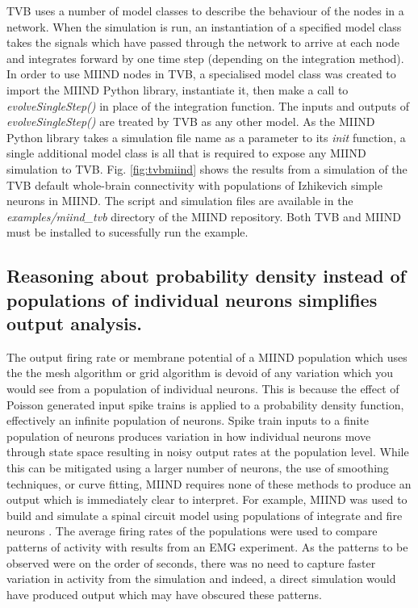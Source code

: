 \documentclass[utf8]{frontiersSCNS} %
\begin{document}
TVB uses a number of model classes to describe the behaviour of the nodes in a network. When the simulation is run, an instantiation of a specified model class takes the signals which have passed through the network to arrive at each node and integrates forward by one time step (depending on the integration method). In order to use MIIND nodes in TVB, a specialised model class was created to import the MIIND Python library, instantiate it, then make a call to \textit{evolveSingleStep()} in place of the integration function. The inputs and outputs of \textit{evolveSingleStep()} are treated by TVB as any other model. As the MIIND Python library takes a simulation file name as a parameter to its \textit{init} function, a single additional model class is all that is required to expose any MIIND simulation to TVB. Fig. \ref{fig:tvbmiind} shows the results from a simulation of the TVB default whole-brain connectivity with populations of Izhikevich simple neurons in MIIND. The script and simulation files are available in the \textit{examples/miind\_tvb} directory of the MIIND repository. Both TVB and MIIND must be installed to sucessfully run the example. \\

\subsection*{Reasoning about probability density instead of populations of individual neurons simplifies output analysis.}
The output firing rate or membrane potential of a MIIND population which uses the the mesh algorithm or grid algorithm is devoid of any variation which you would see from a population of individual neurons. This is because the effect of Poisson generated input spike trains is applied to a probability density function, effectively an infinite population of neurons. Spike train inputs to a finite population of neurons produces variation in how individual neurons move through state space resulting in noisy output rates at the population level. While this can be mitigated using a larger number of neurons, the use of smoothing techniques, or curve fitting, MIIND requires none of these methods to produce an output which is immediately clear to interpret. For example, MIIND was used to build and simulate a spinal circuit model using populations of integrate and fire neurons \citep{york2019muscles}. The average firing rates of the populations were used to compare patterns of activity with results from an EMG experiment. As the patterns to be observed were on the order of seconds, there was no need to capture faster variation in activity from the simulation and indeed, a direct simulation would have produced output which may have obscured these patterns.\\
\end{document}
